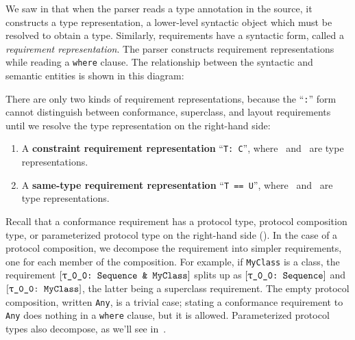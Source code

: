 \documentclass[../generics]{subfiles}
\begin{document}
We saw in  that when the parser reads a type annotation in the source, it constructs a type representation, a lower-level syntactic object which must be resolved to obtain a type. Similarly, requirements have a syntactic form, called a \emph{requirement representation}. The parser constructs requirement representations while reading a \texttt{where} clause. The relationship between the syntactic and semantic entities is shown in this diagram:
\begin{center}
\end{center}
There are only two kinds of requirement representations, because the ``\texttt{:}'' form cannot distinguish between conformance, superclass, and layout requirements until we resolve the type representation on the right-hand side:
\begin{enumerate}
\item A \textbf{constraint requirement representation} ``\texttt{T:\ C}'', where \tT\ and \tC\ are type representations.
\item A \textbf{same-type requirement representation} ``\texttt{T == U}'', where \tT\ and \tU\ are type representations.
\end{enumerate}

Recall that a conformance requirement has a protocol type, protocol composition type, or parameterized protocol type on the right-hand side (). In the case of a protocol composition, we decompose the requirement into simpler requirements, one for each member of the composition. For example, if \texttt{MyClass} is a class, the requirement $\ConfReq{\rT}{Sequence~\&~MyClass}$ splits up as $\rTSequence$ and $\ConfReq{\rT}{MyClass}$, the latter being a superclass requirement. The empty protocol composition, written \texttt{Any}, is a trivial case; stating a conformance requirement to \texttt{Any} does nothing in a \texttt{where} clause, but it is allowed. Parameterized protocol types also decompose, as we'll see in~.
\end{document}
